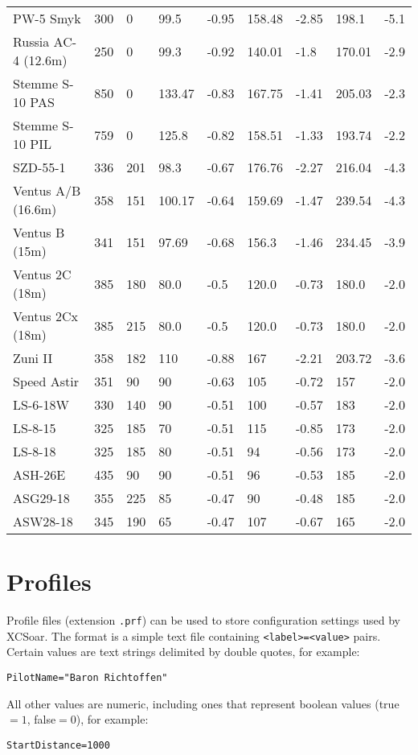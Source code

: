 \begin{maxipage}
\begin{small}
\begin{longtable}{l l l l l l l l l}
PW-5 Smyk & 300 & 0 & 99.5 & -0.95 & 158.48 & -2.85 & 198.1 & -5.1 \\
Russia AC-4 (12.6m) & 250 & 0 & 99.3 & -0.92 & 140.01 & -1.8 & 170.01 & -2.9 \\
Stemme S-10 PAS & 850 & 0 & 133.47 & -0.83 & 167.75 & -1.41 & 205.03 & -2.3 \\
Stemme S-10 PIL & 759 & 0 & 125.8 & -0.82 & 158.51 & -1.33 & 193.74 & -2.2 \\
SZD-55-1 & 336 & 201 & 98.3 & -0.67 & 176.76 & -2.27 & 216.04 & -4.3 \\
Ventus A/B (16.6m) & 358 & 151 & 100.17 & -0.64 & 159.69 & -1.47 & 239.54 & -4.3 \\
Ventus B (15m) & 341 & 151 & 97.69 & -0.68 & 156.3 & -1.46 & 234.45 & -3.9 \\
Ventus 2C (18m) & 385 & 180 & 80.0 & -0.5 & 120.0 & -0.73 & 180.0 & -2.0 \\
Ventus 2Cx (18m) & 385 & 215 & 80.0 & -0.5 & 120.0 & -0.73 & 180.0 & -2.0 \\
Zuni II & 358 & 182 & 110 & -0.88 & 167 & -2.21 & 203.72 & -3.6 \\
Speed Astir & 351 &  90 &  90 & -0.63 & 105 & -0.72 & 157 & -2.0 \\
LS-6-18W &   330 & 140 &  90 & -0.51 & 100 & -0.57 & 183 & -2.0 \\
LS-8-15 &    325 & 185 &  70 & -0.51 & 115 & -0.85 & 173 & -2.0 \\
LS-8-18 &    325 & 185 &  80 & -0.51 &  94 & -0.56 & 173 & -2.0 \\
ASH-26E &    435 &  90 &  90 & -0.51 &  96 & -0.53 & 185 & -2.0 \\
ASG29-18 &   355 & 225 &  85 & -0.47 &  90 & -0.48 & 185 & -2.0 \\
ASW28-18 &   345 & 190 &  65 & -0.47 & 107 & -0.67 & 165 & -2.0 \\
\bottomrule
\end{longtable}
\end{small}
\end{maxipage}

\section{Profiles}

Profile files (extension \verb|.prf|) can be used to store
configuration settings used by XCSoar.  The format is a simple text
file containing \verb|<label>=<value>| pairs.  Certain values are text
strings delimited by double quotes, for example:
\begin{verbatim}
PilotName="Baron Richtoffen"
\end{verbatim}
All other values are numeric, including ones that represent boolean
values (true$=1$, false$=0$), for example:
\begin{verbatim}
StartDistance=1000
\end{verbatim}

